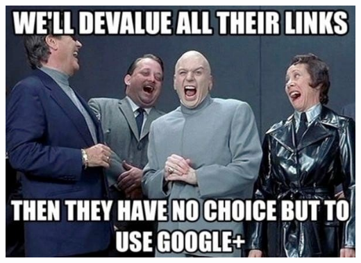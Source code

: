 \documentclass[
10pt, %
aspectratio=169, %
]{beamer}
\begin{document}

	
	{
		{%
			\includegraphics[width=\paperwidth,height=\paperheight]{meme2.jpg}
		}
		
		\begin{frame}
		\end{frame}
	}
	
\end{document}
